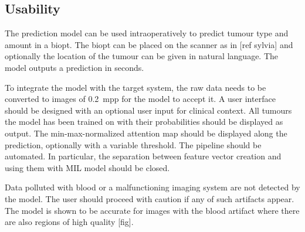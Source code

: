 \subsection{Usability}
The prediction model can be used intraoperatively to predict tumour type and amount in a biopt.
The biopt can be placed on the scanner as in [ref sylvia] and optionally the location of the tumour can be given in natural language.
The model outputs a prediction in seconds.

To integrate the model with the target system, the raw data needs to be converted to images of \qty{0.2}{mpp} for the model to accept it.
A user interface should be designed with an optional user input for clinical context.
All tumours the model has been trained on with their probabilities should be displayed as output.
The min-max-normalized attention map should be displayed along the prediction, optionally with a variable threshold.
The pipeline should be automated.
In particular, the separation between feature vector creation and using them with MIL model should be closed.

Data polluted with blood or a malfunctioning imaging system are not detected by the model.
The user should proceed with caution if any of such artifacts appear.
The model is shown to be accurate for images with the blood artifact where there are also regions of high quality [fig].
